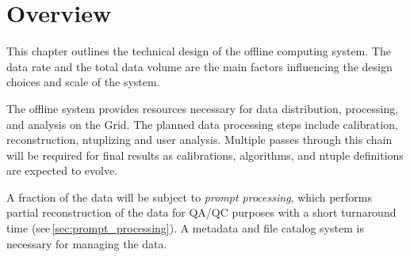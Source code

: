 \section{Overview}

This chapter outlines  the technical design of the offline computing system.
The data rate and the total data volume are the main factors influencing the design choices and scale of the system.   

The offline system provides resources necessary for data distribution, processing, and analysis on the Grid\cite{data_managm_sys}.  
The planned data processing steps include  
calibration, reconstruction, ntuplizing and user analysis.
Multiple passes through this chain will be required for final results as
calibrations, algorithms, and ntuple definitions are expected to evolve.

A fraction of the data will be subject to \textit{prompt processing}, which performs partial reconstruction of the data for QA/QC purposes
with a short turnaround time (see\,\ref{sec:prompt_processing}). 
 A metadata and file catalog system is necessary for managing the data.
